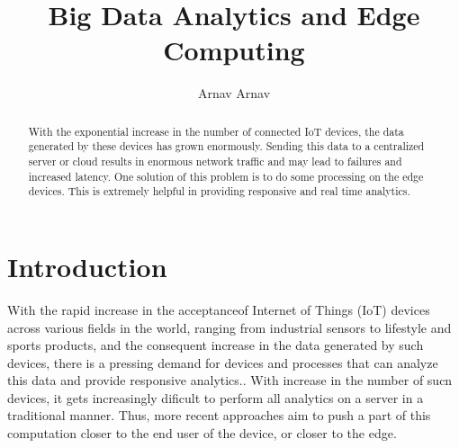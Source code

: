 \documentclass[sigconf]{acmart}
\begin{document}
\title{Big Data Analytics and Edge Computing}


\author{Arnav Arnav}



\begin{abstract}
With the exponential increase in the number of connected IoT devices, the data generated by these devices has grown enormously. Sending this data to a centralized server or cloud results in enormous network traffic and may lead to failures and increased latency. One solution of this problem is to do some processing on the edge devices. This is extremely helpful in providing responsive and real time analytics.
\end{abstract}



\maketitle

\section{Introduction}

With the rapid increase in the acceptanceof Internet of Things (IoT) devices across various fields in the world, ranging from industrial sensors to lifestyle and sports products, and the consequent increase in the data generated by such devices, there is a pressing demand for devices and processes that can analyze this data and provide responsive analytics.\cite{ieee_iot_cloud_analytics_newsletter}. With increase in the number of sucn devices, it gets increasingly dificult to perform  all analytics on a server in a traditional manner. Thus, more recent approaches aim to push a part of this computation closer to the end user of the device, or closer to the edge.




 
\end{document}
